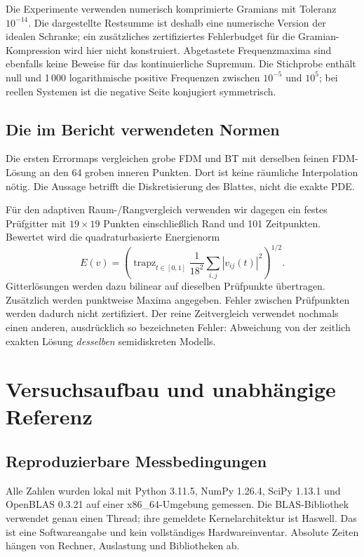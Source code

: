 \documentclass[11pt,a4paper]{article}
\begin{document}
Die Experimente verwenden numerisch komprimierte Gramians mit Toleranz $10^{-14}$. Die dargestellte Restsumme ist deshalb eine numerische Version der idealen Schranke; ein zusätzliches zertifiziertes Fehlerbudget für die Gramian-Kompression wird hier nicht konstruiert. Abgetastete Frequenzmaxima sind ebenfalls keine Beweise für das kontinuierliche Supremum. Die Stichprobe enthält null und 1\,000 logarithmische positive Frequenzen zwischen $10^{-5}$ und $10^5$; bei reellen Systemen ist die negative Seite konjugiert symmetrisch.

\subsection{Die im Bericht verwendeten Normen}
Die ersten Errormaps vergleichen grobe FDM und BT mit derselben feinen FDM-Lösung an den 64 groben inneren Punkten. Dort ist keine räumliche Interpolation nötig. Die Aussage betrifft die Diskretisierung des Blattes, nicht die exakte PDE.

Für den adaptiven Raum-/Rangvergleich verwenden wir dagegen ein festes Prüfgitter mit $19\times19$ Punkten einschließlich Rand und 101 Zeitpunkten. Bewertet wird die quadraturbasierte Energienorm
\begin{equation}\label{eq:energy}
 E(v)=\left(\operatorname{trapz}_{t\in[0,1]}\frac1{18^2}\sum_{i,j}|v_{ij}(t)|^2\right)^{1/2}.
\end{equation}
Gitterlösungen werden dazu bilinear auf dieselben Prüfpunkte übertragen. Zusätzlich werden punktweise Maxima angegeben. Fehler zwischen Prüfpunkten werden dadurch nicht zertifiziert. Der reine Zeitvergleich verwendet nochmals einen anderen, ausdrücklich so bezeichneten Fehler: Abweichung von der zeitlich exakten Lösung \emph{desselben} semidiskreten Modells.


\clearpage

\section{Versuchsaufbau und unabhängige Referenz}
\subsection{Reproduzierbare Messbedingungen}
Alle Zahlen wurden lokal mit Python 3.11.5, NumPy 1.26.4, SciPy 1.13.1 und OpenBLAS 0.3.21 auf einer x86\_64-Umgebung gemessen. Die BLAS-Bibliothek verwendet genau einen Thread; ihre gemeldete Kernelarchitektur ist Haswell. Das ist eine Softwareangabe und kein vollständiges Hardwareinventar. Absolute Zeiten hängen von Rechner, Auslastung und Bibliotheken ab.
\end{document}
